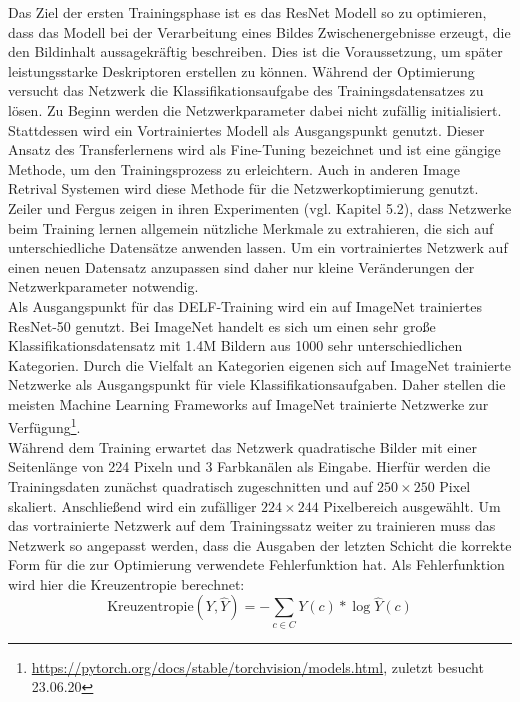 Das Ziel der ersten Trainingsphase ist es das ResNet Modell so zu optimieren, dass das Modell bei der Verarbeitung eines Bildes Zwischenergebnisse erzeugt, die den Bildinhalt aussagekräftig beschreiben. Dies ist die Voraussetzung, um später leistungsstarke Deskriptoren erstellen zu können. Während der Optimierung versucht das Netzwerk die Klassifikationsaufgabe des Trainingsdatensatzes zu lösen. Zu Beginn werden die Netzwerkparameter dabei nicht zufällig initialisiert. Stattdessen wird ein Vortrainiertes Modell als Ausgangspunkt genutzt. Dieser Ansatz des Transferlernens wird als Fine-Tuning bezeichnet und ist eine gängige Methode, um den Trainingsprozess zu erleichtern. Auch in anderen Image Retrival Systemen \cite{convnet} \cite{siamac_contrastive_loss} wird diese Methode für die Netzwerkoptimierung genutzt. Zeiler und Fergus zeigen in ihren Experimenten (vgl. \cite{extraction_point_meaning} Kapitel 5.2), dass Netzwerke beim Training lernen allgemein nützliche Merkmale zu extrahieren, die sich auf unterschiedliche Datensätze anwenden lassen. Um ein vortrainiertes Netzwerk auf einen neuen Datensatz anzupassen sind daher nur kleine Veränderungen der Netzwerkparameter notwendig.
\\
Als Ausgangspunkt für das DELF-Training wird ein auf ImageNet trainiertes ResNet-50 genutzt. Bei ImageNet handelt es sich um einen sehr große Klassifikationsdatensatz mit 1.4M Bildern aus 1000 sehr unterschiedlichen Kategorien. Durch die Vielfalt an Kategorien eigenen sich auf ImageNet trainierte Netzwerke als Ausgangspunkt für viele Klassifikationsaufgaben. Daher stellen die meisten Machine Learning Frameworks auf ImageNet trainierte Netzwerke zur Verfügung\footnote{\url{https://pytorch.org/docs/stable/torchvision/models.html}, zuletzt besucht 23.06.20}. 
\\
Während dem Training erwartet das Netzwerk quadratische Bilder mit einer Seitenlänge von 224 Pixeln und 3 Farbkanälen als Eingabe. Hierfür werden die Trainingsdaten zunächst quadratisch zugeschnitten und auf $250\times250$ Pixel skaliert. Anschließend wird ein zufälliger $224\times244$ Pixelbereich ausgewählt.
Um das vortrainierte Netzwerk auf dem Trainingssatz weiter zu trainieren muss das Netzwerk so angepasst werden, dass die Ausgaben der letzten Schicht die korrekte Form für die zur Optimierung verwendete Fehlerfunktion hat. Als Fehlerfunktion wird hier die Kreuzentropie berechnet:
\begin{equation}
\text{Kreuzentropie}(Y,\hat{Y}) = -\sum_{c \in C}{Y(c)*\log\hat{Y}(c)}
\end{equation}
